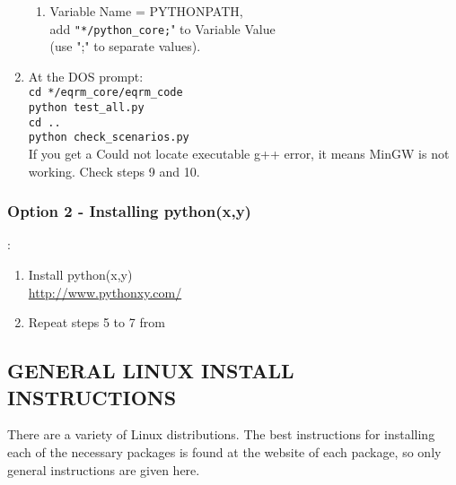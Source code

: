 \documentclass[a4paper, 12pt]{article}
\begin{document}
\begin{enumerate}
\begin{enumerate}
\item Variable Name = PYTHONPATH, \\
add \texttt{"*/python\_core;}" to Variable Value \\
(use ";" to separate values).
\end{enumerate}

\item At the DOS prompt: \\
\texttt{cd */eqrm\_core/eqrm\_code} \\
\texttt{python test\_all.py} \\
\texttt{cd ..} \\
\texttt{python check\_scenarios.py} \\
If you get a Could not locate executable g++ error, it means MinGW
is not working.  Check steps 9 and 10.
\end{enumerate}
%
%
%
\subsubsection{Option 2 - Installing python(x,y)}:
\label{sec:windows-option2}

\begin{enumerate}
\item Install python(x,y) \\
\url{http://www.pythonxy.com/}
\item Repeat steps 5 to 7 from 
\end{enumerate}


\subsection{GENERAL LINUX INSTALL INSTRUCTIONS}

There are a variety of Linux distributions.  The best instructions
for installing each of the necessary packages is found at the
website of each package, so only general instructions are given
here.
\end{document}

